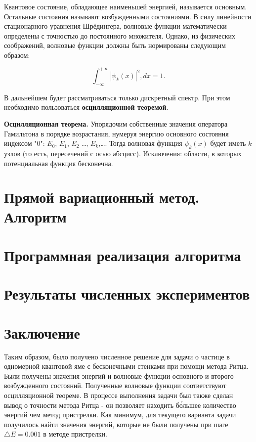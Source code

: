 \documentclass[a4paper,12pt]{article}
\begin{document}
Квантовое состояние, обладающее наименьшей энергией, называется основным.
Остальные состояния называют возбужденными состояниями.
В силу линейности стационарного уравнения Шрёдингера, волновые функции математически определены с точностью до постоянного множителя.
Однако, из физических соображений, волновые функции должны быть нормированы следующим образом:

\begin{equation}
    \int_{-\infty}^{+\infty} |\psi_k(x)|^2, dx = 1.
    \label{eq:wave_func_normalization}
\end{equation}

В дальнейшем будет рассматриваться только дискретный спектр.
При этом необходимо пользоваться \textbf{осцилляционной теоремой}.

\textbf{Осцилляционная теорема.}
Упорядочим собственные значения оператора Гамильтона в порядке возрастания, нумеруя энергию основного состояния индексом "0": $E_0$, $E_1$, $E_2$ \dots, $E_k$,\dots.
Тогда волновая функция $\psi_k(x)$ будет иметь $k$ узлов (то есть, пересечений с осью абсцисс).
Исключения: области, в которых потенциальная функция бесконечна.

\newpage

\section{Прямой вариационный метод. Алгоритм}\label{sec:solve_method}


\newpage

\section{Программная реализация алгоритма}\label{sec:--}


\newpage

\section{Результаты численных экспериментов}\label{sec:results}


\section{Заключение}\label{sec:zakl}

Таким образом, было получено численное решение для задачи о частице в одномерной квантовой яме с бесконечными стенками при помощи метода Ритца.
Были получены значения энергий и волновые функции основного и второго возбужденного состояний.
Полученные волновые функции соответствуют осцилляционной теореме.
В процессе выполнения задачи был также сделан вывод о точности метода Ритца - он позволяет находить б\'{о}льшее количество энергий чем метод пристрелки.
Как минимум, для текущего варианта задачи получилось найти значения энергий, которые не были получены при шаге $\triangle E = 0.001$ в методе пристрелки.
\end{document}
